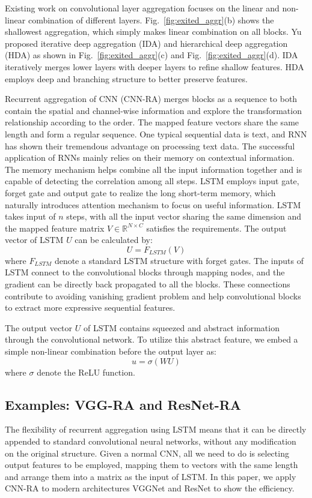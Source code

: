 \documentclass[conference]{IEEEtran}
\begin{document}
Existing work on convolutional layer aggregation focuses on the linear and non-linear combination of different layers. Fig.~\ref{fig:exited_aggr}(b) shows the shallowest aggregation, which simply makes linear combination on all blocks. Yu\cite{dla} proposed iterative deep aggregation (IDA) and hierarchical deep aggregation (HDA) as shown in Fig.~\ref{fig:exited_aggr}(c) and Fig.~\ref{fig:exited_aggr}(d).  IDA iteratively merges lower layers with deeper layers to refine shallow features. HDA employs deep and branching structure to better preserve features.

Recurrent aggregation of CNN (CNN-RA) merges blocks as a sequence to both contain the spatial and channel-wise information and explore the transformation relationship according to the order. The mapped feature vectors share the same length and form a regular sequence. One typical sequential data is text, and RNN has shown their tremendous advantage on processing text data. The successful application of RNNs mainly relies on their memory on contextual information. The memory mechanism helps combine all the input information together and is capable of detecting the correlation among all steps. LSTM employs input gate, forget gate and output gate to realize the long short-term memory, which naturally introduces attention mechanism to focus on useful information. LSTM takes input of $n$ steps, with all the input vector sharing the same dimension and the mapped feature matrix $V\in \mathbb{R}^{N\times C}$ satisfies the requirements. The output vector of LSTM $U$ can be calculated by:
\begin{equation}
U = F_{LSTM}(V)
\end{equation}
where $F_{LSTM}$ denote a standard LSTM structure with forget gates. The inputs of LSTM connect to the convolutional blocks through mapping nodes, and the gradient can be directly back propagated to all the blocks. These connections contribute to avoiding vanishing gradient problem and help convolutional blocks to extract more expressive sequential features.

The output vector $U$ of LSTM contains squeezed and abstract information through the convolutional network. To utilize this abstract feature, we embed a simple non-linear combination before the output layer as:
\begin{equation}
u = \sigma(WU)
\end{equation}
where $\sigma$ denote the ReLU\cite{ReLU} function. 

\subsection{Examples: VGG-RA and ResNet-RA}
The flexibility of recurrent aggregation using LSTM means that it can be directly appended to standard convolutional neural networks, without any modification on the original structure. Given a normal CNN, all we need to do is selecting output features to be employed, mapping them to vectors with the same length and arrange them into a matrix as the input of LSTM. In this paper, we apply CNN-RA to modern architectures VGGNet and ResNet to show the efficiency.
\end{document}
